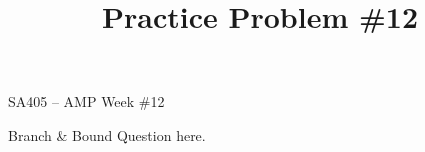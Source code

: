\documentclass[11pt]{article}
\makeatletter
\theoremstyle{definition}
\renewcommand{\maketitle}{
  \noindent SA405 -- AMP \hfill Week \#12\\

  \begin{center}\Large{\textbf{\@title}}\end{center}
}
\makeatother
\begin{document}
  
\title{Practice Problem \#12}

\maketitle



Branch \& Bound Question here.


		
\end{document}

